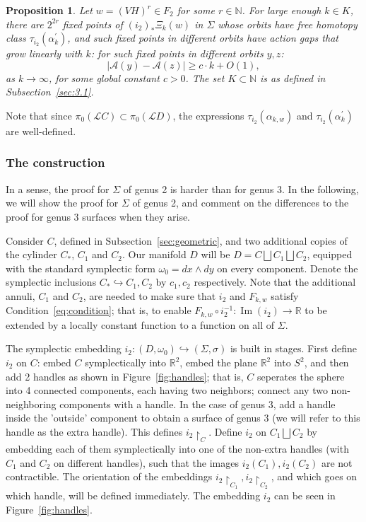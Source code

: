 \documentclass[11pt]{article}
\newtheorem{prop}[theorem]{Proposition}
\newcommand{\R}{\mathbb{R}}
\newcommand{\N}{\mathbb{N}}
\DeclareMathOperator{\Ima}{Im}
\begin{document}
        \begin{prop}
        \label{prop:new2}
            Let $w = (VH)^r \in F_2$ for some $r \in \N$. For large enough $k \in K$, there are $2^{2r}$ fixed points of $(i_2)_* \Xi_k(w)$ in $\Sigma$ whose orbits have free homotopy class $\tau_{i_2}(\alpha_k^\prime)$, and such fixed points in different orbits have action gaps that grow linearly with $k$: for such fixed points in different orbits $y, z$:
            \[
                | \mathcal{A}(y) - \mathcal{A}(z) | \geq c \cdot k + O(1) ,
            \]
            as $k \to \infty$, for some global constant $c > 0$. The set $K \subset \N$ is as defined in Subsection~\ref{sec:3.1}.
        \end{prop}
        
        Note that since $\pi_0(\mathscr{L}C) \subset \pi_0(\mathscr{L}D)$, the expressions $\tau_{i_2}(\alpha_{k,w})$ and $\tau_{i_2}(\alpha_k^\prime)$ are well-defined.
        
        \subsubsection{The construction}
        \label{sec:3.2.1}
            In a sense, the proof for $\Sigma$ of genus 2 is harder than for genus 3. In the following, we will show the proof for $\Sigma$ of genus 2, and comment on the differences to the proof for genus 3 surfaces when they arise.
            
            Consider $C$, defined in Subsection~\ref{sec:geometric}, and two additional copies of the cylinder $C_*$, $C_1$ and $C_2$. Our manifold $D$ will be $D = C \bigsqcup C_1 \bigsqcup C_2$, equipped with the standard symplectic form $\omega_0 = dx \wedge dy$ on every component. Denote the symplectic inclusions $C_* \hookrightarrow C_1,C_2$ by $c_1,c_2$ respectively. Note that the additional annuli, $C_1$ and $C_2$, are needed to make sure that $i_2$ and $F_{k,w}$ satisfy Condition~\ref{eq:condition}; that is, to enable $F_{k,w} \circ i_2^{-1}: \Ima(i_2) \to \R$ to be extended by a locally constant function to a function on all of $\Sigma$.
            
            The symplectic embedding $i_2:(D,\omega_0) \hookrightarrow (\Sigma, \sigma)$ is built in stages. First define $i_2$ on $C$: embed $C$ symplectically into $\R^2$, embed the plane $\R^2$ into $S^2$, and then add 2 handles as shown in Figure~\ref{fig:handles}; that is, $C$ seperates the sphere into 4 connected components, each having two neighbors; connect any two non-neighboring components with a handle. In the case of genus 3, add a handle inside the 'outside' component to obtain a surface of genus 3 (we will refer to this handle as the extra handle). This defines $i_2 \restriction_C$. Define $i_2$ on $C_1 \bigsqcup C_2$ by embedding each of them symplectically into one of the non-extra handles (with $C_1$ and $C_2$ on different handles), such that the images $i_2(C_1), i_2(C_2)$ are not contractible. The orientation of the embeddings $i_2\restriction_{C_1}, i_2\restriction_{C_2}$, and which goes on which handle, will be defined immediately. The embedding $i_2$ can be seen in Figure~\ref{fig:handles}.
            
\end{document}
